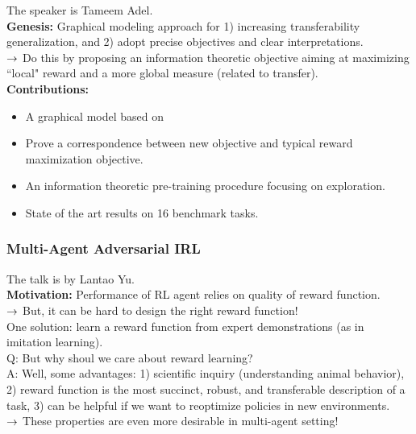 The speaker is Tameem Adel. \\

{\bf Genesis:} Graphical modeling approach for 1) increasing transferability generalization, and 2) adopt precise objectives and clear interpretations. \\

$\rightarrow$ Do this by proposing an information theoretic objective aiming at maximizing ``local" reward and a more global measure (related to transfer). \\

{\bf Contributions:}
\begin{itemize}
    \item A graphical model based on
    \item Prove a correspondence between new objective and typical reward maximization objective.
    \item An information theoretic pre-training procedure focusing on exploration.
    \item State of the art results on 16 benchmark tasks.
\end{itemize}

\spacerule

\subsubsection{Multi-Agent Adversarial IRL~\cite{yu2019multi}}

The talk is by Lantao Yu. \\

{\bf Motivation:} Performance of RL agent relies on quality of reward function. \\

$\rightarrow$ But, it can be hard to design the right reward function! \\

One solution: learn a reward function from expert demonstrations (as in imitation learning). \\

Q: But why shoul we care about reward learning? \\

A: Well, some advantages: 1) scientific inquiry (understanding animal behavior), 2) reward function is the most succinct, robust, and transferable description of a task, 3) can be helpful if we want to reoptimize policies in new environments.  \\

$\rightarrow$ These properties are even more desirable in multi-agent setting! \\

